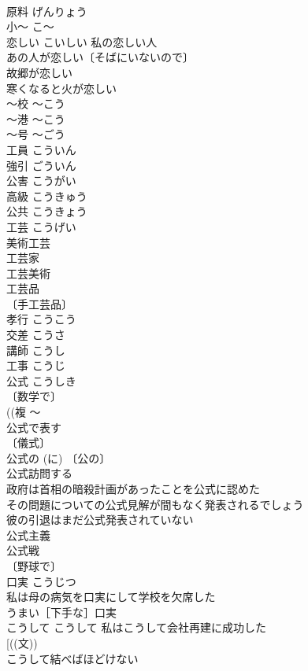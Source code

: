 \documentclass[8pt]{extreport}
\begin{document}
\begin{CJK}{UTF8}{min}
\\	原料	げんりょう	
\\	小～	こ～	
\\	恋しい	こいしい	私の恋しい人 
\\	あの人が恋しい〔そばにいないので〕 
\\	故郷が恋しい 
\\	寒くなると火が恋しい 
\\	～校	～こう	
\\	～港	～こう	
\\	～号	～ごう	
\\	工員	こういん	
\\	強引	ごういん	
\\	公害	こうがい	
\\	高級	こうきゅう	
\\	公共	こうきょう	
\\	工芸	こうげい	
\\	美術工芸 
\\	工芸家 
\\	工芸美術 
\\	工芸品 
\\	〔手工芸品〕
\\	孝行	こうこう	
\\	交差	こうさ	
\\	講師	こうし	
\\	工事	こうじ	
\\	公式	こうしき	
\\	〔数学で〕
\\	((複 〜
\\	公式で表す 
\\	〔儀式〕
\\	公式の (に) 〔公の〕
\\	公式訪問する 
\\	政府は首相の暗殺計画があったことを公式に認めた 
\\	その問題についての公式見解が間もなく発表されるでしょう 
\\	彼の引退はまだ公式発表されていない 
\\	公式主義 
\\	公式戦 
\\	〔野球で〕
\\	口実	こうじつ	
\\	私は母の病気を口実にして学校を欠席した 
\\	うまい［下手な］口実 
\\	こうして	こうして	私はこうして会社再建に成功した 
\\	[((文))
\\	こうして結べばほどけない 

\end{CJK}
\end{document}
